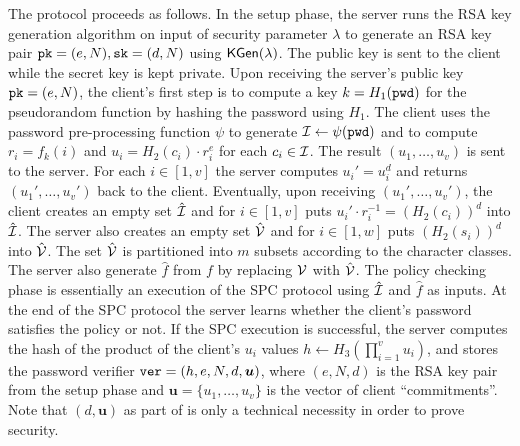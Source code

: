 The protocol proceeds as follows. 
In the setup phase, the server runs the RSA key generation algorithm on input of security parameter $\lambda$ to generate an RSA key pair $\mathtt{pk}=(e,N), \mathtt{sk}=(d,N)$ using $\mathsf{KGen}(\lambda)$. 
The public key is sent to the client while the secret key is kept private. 
Upon receiving the server's public key $\mathtt{pk}=(e,N)$, the client's first step is to compute a key $k=H_1(\mathtt{pwd})$ for the pseudorandom function by hashing the password using $H_1$. The client uses the password pre-processing function $\psi$ to generate $\mathcal{I}\gets\psi(\mathtt{pwd})$ and to compute $r_i=f_k(i)$ and $u_i=H_2(c_i)\cdot r_i^e$ for each $c_i\in\mathcal{I}$.
The result $(u_1,\ldots,u_v)$ is sent to the server.
For each $i\in[1,v]$ the server computes $u_i'=u_i^d$ and returns $(u_1',\ldots,u_v')$ back to the client. 
Eventually, upon receiving $(u_1',\ldots,u_v')$, the client creates an empty set $\hat{\mathcal{I}}$ and for $i\in[1,v]$ puts $u_i'\cdot r_i^{-1}=(H_2(c_i))^d$ into $\hat{\mathcal{I}}$. 
The server also creates an empty set $\hat{\mathcal{V}}$ and for $i\in[1,w]$ puts $(H_2(s_i))^d$ into $\hat{\mathcal{V}}$. The set $\hat{\mathcal{V}}$ is partitioned into $m$ subsets according to the character classes. 
The server also generate $\hat{f}$ from $f$ by replacing $\mathcal{V}$ with $\hat{\mathcal{V}}$.
The policy checking phase is essentially an execution of  the \ac{SPC} protocol using $\hat{\mathcal{I}}$ and $\hat{f}$ as inputs. 
At the end of the \ac{SPC} protocol the server learns whether the client's password satisfies the policy or not. 
If the \ac{SPC} execution is successful, the server computes the hash of the product of the client's $u_i$ values $h\gets H_3(\prod_{i=1}^v u_i)$, and stores the password verifier $\mathtt{ver} = (h,e,N,d,\bm{u})$, where $(e,N,d)$ is the RSA key pair from the setup phase and $\bm{u}=\{u_1,\dots,u_v\}$ is the vector of client ``commitments''.
Note that $(d, \bm{u})$ as part of \ver is only a technical necessity in order to prove security.

